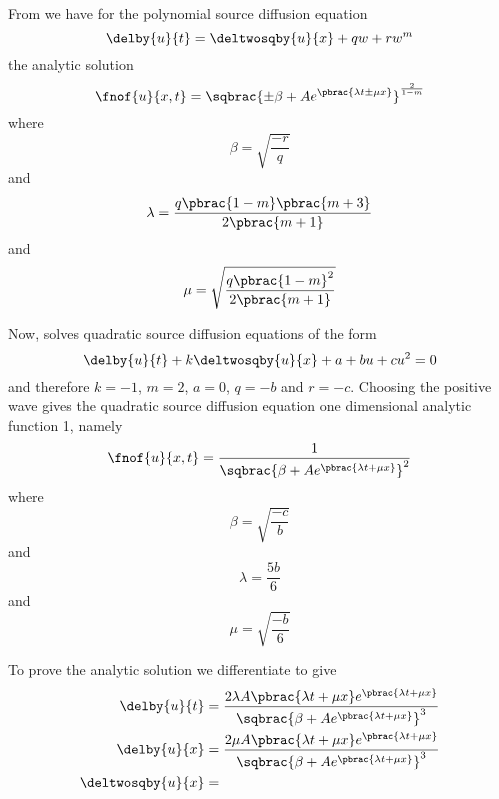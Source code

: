 From  we have for
the \oned polynomial source diffusion equation
\begin{equation}
  \delby{u}{t}=\deltwosqby{u}{x}+qw+rw^{m}
\end{equation}
the analytic solution
\begin{equation}
  \fnof{u}{x,t}=\sqbrac{\pm\beta+Ae^{\pbrac{\lambda t \pm\mu x}}}^\frac{2}{1-m}
\end{equation}
where
\begin{equation}
  \beta=\sqrt{\dfrac{-r}{q}}
\end{equation}
and
\begin{equation}
  \lambda=\dfrac{q\pbrac{1-m}\pbrac{m+3}}{2\pbrac{m+1}}
\end{equation}
and 
\begin{equation}
  \mu=\sqrt{\dfrac{q\pbrac{1-m}^{2}}{2\pbrac{m+1}}}
\end{equation}

Now, \OpenCMISS solves quadratic source diffusion equations of the form
\begin{equation}
  \delby{u}{t}+k\deltwosqby{u}{x}+a+bu+cu^{2}=0
  \label{eqn:OpenCMISSQuadraticSourceDiffusionEquationOneDim}
\end{equation}
and therefore $k=-1$, $m=2$, $a=0$, $q=-b$ and $r=-c$. Choosing the positive wave gives the
\OpenCMISS quadratic source diffusion equation one dimensional analytic function 1, namely
\begin{equation}
  \fnof{u}{x,t}=\dfrac{1}{\sqbrac{\beta+Ae^{\pbrac{\lambda t + \mu x}}}^{2}}
  \label{eqn:AnalyticQuadraticSourceDiffusionEquationOneDim1}
\end{equation}
where
\begin{equation}
  \beta=\sqrt{\dfrac{-c}{b}}
\end{equation}
and
\begin{equation}
  \lambda=\dfrac{5b}{6}
\end{equation}
and 
\begin{equation}
  \mu=\sqrt{\dfrac{-b}{6}}
\end{equation}

To prove the analytic solution we differentiate
 to give 
\begin{align}
  \delby{u}{t} &= \dfrac{2\lambda A\pbrac{\lambda t+\mu x}e^{\pbrac{\lambda t+\mu
        x}}}{\sqbrac{\beta+Ae^{\pbrac{\lambda t + \mu x}}}^{3}} \\
  \delby{u}{x} &= \dfrac{2\mu A\pbrac{\lambda t+\mu x}e^{\pbrac{\lambda t+\mu
        x}}}{\sqbrac{\beta+Ae^{\pbrac{\lambda t + \mu x}}}^{3}} \\
  \deltwosqby{u}{x} &=
  \label{eqn:AnalyticDiffusionEquationOneDim1Derivatives}
\end{align}

